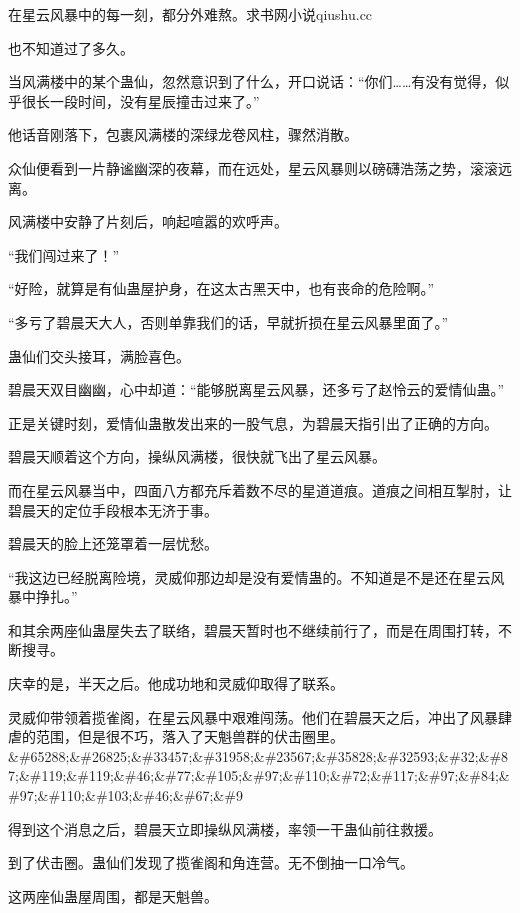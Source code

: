 
\begin{this_body}

在星云风暴中的每一刻，都分外难熬。求书网小说qiushu.cc

也不知道过了多久。

当风满楼中的某个蛊仙，忽然意识到了什么，开口说话：“你们……有没有觉得，似乎很长一段时间，没有星辰撞击过来了。”

他话音刚落下，包裹风满楼的深绿龙卷风柱，骤然消散。

众仙便看到一片静谧幽深的夜幕，而在远处，星云风暴则以磅礴浩荡之势，滚滚远离。

风满楼中安静了片刻后，响起喧嚣的欢呼声。

“我们闯过来了！”

“好险，就算是有仙蛊屋护身，在这太古黑天中，也有丧命的危险啊。”

“多亏了碧晨天大人，否则单靠我们的话，早就折损在星云风暴里面了。”

蛊仙们交头接耳，满脸喜色。

碧晨天双目幽幽，心中却道：“能够脱离星云风暴，还多亏了赵怜云的爱情仙蛊。”

正是关键时刻，爱情仙蛊散发出来的一股气息，为碧晨天指引出了正确的方向。

碧晨天顺着这个方向，操纵风满楼，很快就飞出了星云风暴。

而在星云风暴当中，四面八方都充斥着数不尽的星道道痕。道痕之间相互掣肘，让碧晨天的定位手段根本无济于事。

碧晨天的脸上还笼罩着一层忧愁。

“我这边已经脱离险境，灵威仰那边却是没有爱情蛊的。不知道是不是还在星云风暴中挣扎。”

和其余两座仙蛊屋失去了联络，碧晨天暂时也不继续前行了，而是在周围打转，不断搜寻。

庆幸的是，半天之后。他成功地和灵威仰取得了联系。

灵威仰带领着揽雀阁，在星云风暴中艰难闯荡。他们在碧晨天之后，冲出了风暴肆虐的范围，但是很不巧，落入了天魁兽群的伏击圈里。\&\#65288;\&\#26825;\&\#33457;\&\#31958;\&\#23567;\&\#35828;\&\#32593;\&\#32;\&\#87;\&\#119;\&\#119;\&\#46;\&\#77;\&\#105;\&\#97;\&\#110;\&\#72;\&\#117;\&\#97;\&\#84;\&\#97;\&\#110;\&\#103;\&\#46;\&\#67;\&\#9

得到这个消息之后，碧晨天立即操纵风满楼，率领一干蛊仙前往救援。

到了伏击圈。蛊仙们发现了揽雀阁和角连营。无不倒抽一口冷气。

这两座仙蛊屋周围，都是天魁兽。


\end{this_body}
